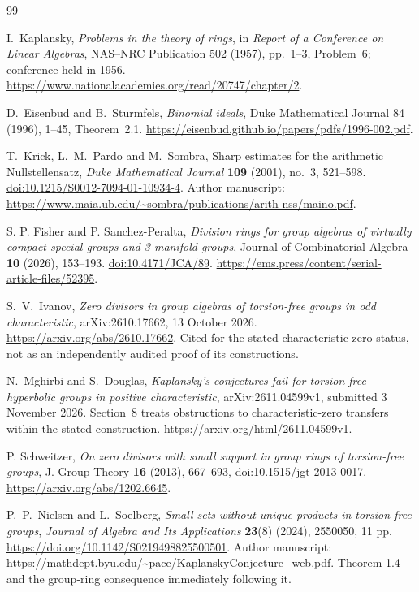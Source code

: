 \documentclass[11pt,a4paper,oneside]{report}
\theoremstyle{definition}
\theoremstyle{remark}
\begin{document}
\begin{thebibliography}{99}
I.~Kaplansky, \emph{Problems in the theory of rings}, in
\emph{Report of a Conference on Linear Algebras}, NAS--NRC Publication
502 (1957), pp.~1--3, Problem~6; conference held in 1956.
\url{https://www.nationalacademies.org/read/20747/chapter/2}.

D.~Eisenbud and B.~Sturmfels, \emph{Binomial ideals}, Duke
Mathematical Journal 84 (1996), 1--45, Theorem~2.1.
\url{https://eisenbud.github.io/papers/pdfs/1996-002.pdf}.

T.~Krick, L.~M.~Pardo and M.~Sombra, Sharp estimates for the arithmetic
Nullstellensatz, \emph{Duke Mathematical Journal} \textbf{109} (2001),
no.~3, 521--598. \href{https://doi.org/10.1215/S0012-7094-01-10934-4}{doi:10.1215/S0012-7094-01-10934-4}.
Author manuscript: \url{https://www.maia.ub.edu/~sombra/publications/arith-nss/maino.pdf}.

S. P. Fisher and P. Sanchez-Peralta,
\emph{Division rings for group algebras of virtually compact special groups and 3-manifold groups},
Journal of Combinatorial Algebra \textbf{10} (2026), 153--193.
\href{https://doi.org/10.4171/JCA/89}{doi:10.4171/JCA/89}.
\url{https://ems.press/content/serial-article-files/52395}.

S.~V.~Ivanov,
\emph{Zero divisors in group algebras of torsion-free groups in
odd characteristic}, arXiv:2610.17662, 13 October 2026.
\url{https://arxiv.org/abs/2610.17662}.
Cited for the stated characteristic-zero status, not as an
independently audited proof of its constructions.

N.~Mghirbi and S.~Douglas, \emph{Kaplansky's conjectures fail for
torsion-free hyperbolic groups in positive characteristic},
arXiv:2611.04599v1, submitted 3 November 2026. Section~8 treats
obstructions to characteristic-zero transfers within the stated construction.
\url{https://arxiv.org/html/2611.04599v1}.

P. Schweitzer, \emph{On zero divisors with small support in group rings of torsion-free groups}, J. Group Theory \textbf{16} (2013), 667--693, doi:10.1515/jgt-2013-0017. \url{https://arxiv.org/abs/1202.6645}.

P.~P.~Nielsen and L.~Soelberg,
\emph{Small sets without unique products in torsion-free groups},
\emph{Journal of Algebra and Its Applications} \textbf{23}(8)
(2024), 2550050, 11 pp.
\url{https://doi.org/10.1142/S0219498825500501}.
Author manuscript: \url{https://mathdept.byu.edu/~pace/KaplanskyConjecture_web.pdf}.
Theorem 1.4 and the group-ring consequence immediately following it.


\end{thebibliography}
\end{document}
